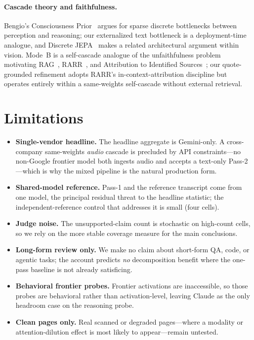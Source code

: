 \documentclass[11pt]{article}
\begin{document}
\paragraph{Cascade theory and faithfulness.} Bengio's Consciousness Prior~\cite{bengio2017consciousness} argues for sparse discrete bottlenecks between perception and reasoning; our externalized text bottleneck is a deployment-time analogue, and Discrete JEPA~\cite{discretejepa2025} makes a related architectural argument within vision. Mode~B is a self-cascade analogue of the unfaithfulness problem motivating RAG~\cite{rag2020}, RARR~\cite{rarr2023}, and Attribution to Identified Sources~\cite{ais2022}; our quote-grounded refinement adopts RARR's in-context-attribution discipline but operates entirely within a same-weights self-cascade without external retrieval.

\section{Limitations}
\label{sec:discussion}

\begin{itemize}[leftmargin=1.3em,itemsep=3pt,topsep=2pt,parsep=0pt]
\item \textbf{Single-vendor headline.} The headline aggregate is Gemini-only. A cross-company same-weights \emph{audio} cascade is precluded by API constraints---no non-Google frontier model both ingests audio and accepts a text-only Pass-2---which is why the mixed pipeline is the natural production form.
\item \textbf{Shared-model reference.} Pass-1 and the reference transcript come from one model, the principal residual threat to the headline statistic; the independent-reference control that addresses it is small (four cells).
\item \textbf{Judge noise.} The unsupported-claim count is stochastic on high-count cells, so we rely on the more stable coverage measure for the main conclusions.
\item \textbf{Long-form review only.} We make no claim about short-form QA, code, or agentic tasks; the account predicts \emph{no} decomposition benefit where the one-pass baseline is not already satisficing.
\item \textbf{Behavioral frontier probes.} Frontier activations are inaccessible, so those probes are behavioral rather than activation-level, leaving Claude as the only headroom case on the reasoning probe.
\item \textbf{Clean pages only.} Real scanned or degraded pages---where a modality or attention-dilution effect is most likely to appear---remain untested.
\end{itemize}
\end{document}

